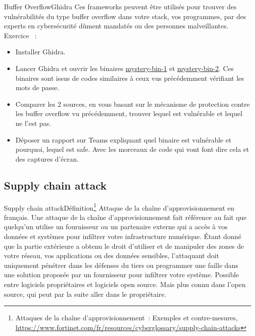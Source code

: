 \documentclass{beamer}
\begin{document}
    \begin{frame}{Buffer Overflow}{Ghidra}
        Ces frameworks peuvent être utilisés pour trouver des vulnérabilités du type buffer overflow dans votre stack, vos programmes, par des experts en cybersécurité dûment mandatés ou des personnes malveillantes.
        \bigbreak
        Exercice \execcounterdispinc{}~:
        \begin{itemize}
            \item Installer Ghidra.
            \item Lancer Ghidra et ouvrir les binaires \href{https://github.com/St-Michel-IT/data-security/blob/main/mystery-bin-1}{mystery-bin-1} et \href{https://github.com/St-Michel-IT/data-security/blob/main/mystery-bin-2}{mystery-bin-2}.
            Ces binaires sont issus de codes similaires à ceux vus précédemment vérifiant les mots de passe.
            \item Comparer les 2 sources, en vous basant sur le mécanisme de protection contre les buffer overflow vu précédemment, trouver lequel est vulnérable et lequel ne l'est pas.
            \item Déposer un rapport sur Teams expliquant quel binaire est vulnérable et pourquoi, lequel est safe.
            Avec les morceaux de code qui vont font dire cela et des captures d'écran.
        \end{itemize}
    \end{frame}

    \subsection{Supply chain attack}\label{subsec:supply-chain-attack}
    \begin{frame}{Supply chain attack}{Définition\footnote{Attaques de la chaîne d’approvisionnement~: Exemples et contre-mesures, \url{https://www.fortinet.com/fr/resources/cyberglossary/supply-chain-attacks}}}
        Attaque de la chaîne d'approvisionnement en français.
        \bigbreak
        Une attaque de la chaîne d’approvisionnement fait référence au fait que quelqu’un utilise un fournisseur ou un partenaire externe qui a accès à vos données et systèmes pour infiltrer votre infrastructure numérique.
        Étant donné que la partie extérieure a obtenu le droit d’utiliser et de manipuler des zones de votre réseau, vos applications ou des données sensibles, l’attaquant doit uniquement pénétrer dans les défenses du tiers ou programmer une faille dans une solution proposée par un fournisseur pour infiltrer votre système.
        \bigbreak
        Possible entre logiciels propriétaires et logiciels open source.
        Mais plus connu dans l'open source, qui peut par la suite aller dans le propriétaire.
    \end{frame}
\end{document}
